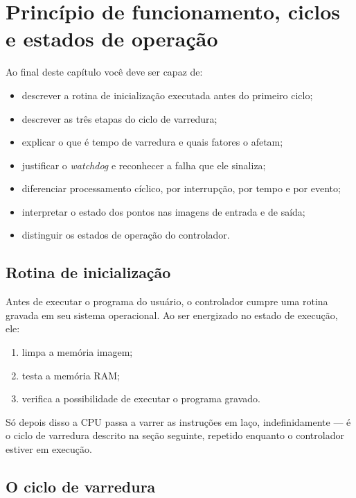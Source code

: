 \chapter{Princípio de funcionamento, ciclos e estados de operação}
\label{cap:funcionamento}

\begin{objetivos}
Ao final deste capítulo você deve ser capaz de:
\begin{itemize}
  \item descrever a rotina de inicialização executada antes do primeiro ciclo;
  \item descrever as três etapas do ciclo de varredura;
  \item explicar o que é tempo de varredura e quais fatores o afetam;
  \item justificar o \emph{watchdog} e reconhecer a falha que ele sinaliza;
  \item diferenciar processamento cíclico, por interrupção, por tempo e por evento;
  \item interpretar o estado dos pontos nas imagens de entrada e de saída;
  \item distinguir os estados de operação do controlador.
\end{itemize}
\end{objetivos}

\section{Rotina de inicialização}

Antes de executar o programa do usuário, o controlador cumpre uma rotina gravada em seu sistema
operacional. Ao ser energizado no estado de execução, ele:

\begin{enumerate}
  \item limpa a memória imagem;
  \item testa a memória RAM;
  \item verifica a possibilidade de executar o programa gravado.
\end{enumerate}

Só depois disso a CPU passa a varrer as instruções em laço, indefinidamente --- é o ciclo de
varredura descrito na seção seguinte, repetido enquanto o controlador estiver em execução.

\section{O ciclo de varredura}

